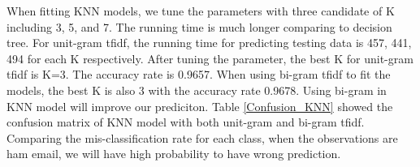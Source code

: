 
When fitting KNN models, we tune the parameters with three candidate of K including 3, 5, and 7. The running time is much longer comparing to decision tree. For unit-gram tfidf, the running time for predicting testing data is 457, 441, 494 for each K respectively. After tuning the parameter, the best K for unit-gram tfidf is K=3. The accuracy rate is 0.9657. When using bi-gram tfidf to fit the models, the best K is also 3 with the accuracy rate 0.9678. Using bi-gram in KNN model will improve our prediciton. Table \ref{Confusion_KNN} showed the confusion matrix of KNN model with both unit-gram and bi-gram tfidf. Comparing the mis-classification rate for each class, when the observations are ham email, we will have high probability to have wrong prediction.\\

